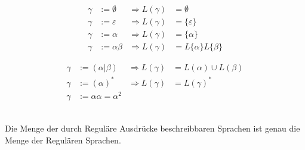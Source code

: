 \documentclass{scrartcl}
\begin{document}
\begin{minipage}[t]{0.48\textwidth}
    \begin{align*}
        \gamma &:= \emptyset & \Rightarrow L(\gamma) &= \emptyset \\
        \gamma &:=\varepsilon & \Rightarrow L(\gamma) &= \{\varepsilon\} \\
        \gamma &:=\alpha & \Rightarrow L(\gamma) &= \{\alpha\} \\
        \gamma &:=\alpha\beta & \Rightarrow L(\gamma) &= L\{\alpha\}L\{\beta\}
    \end{align*}
\end{minipage}
\hfill \vrule \hfill
\begin{minipage}[t]{0.48\textwidth}
    \begin{align*}
        \gamma &:= \left(\alpha\vert\beta\right) & \Rightarrow L\left(\gamma\right)&=L(\alpha)\cup L(\beta) \\
        \gamma &:= \left(\alpha\right)^* & \Rightarrow L(\gamma) &= L(\gamma)^* \\
        \gamma &:= \alpha\alpha = \alpha^2
    \end{align*}
\end{minipage}

\begin{shaded}
    \ \\Die Menge der durch Reguläre Ausdrücke beschreibbaren Sprachen ist genau die Menge der Regulären Sprachen.
\end{shaded}
\end{document}
